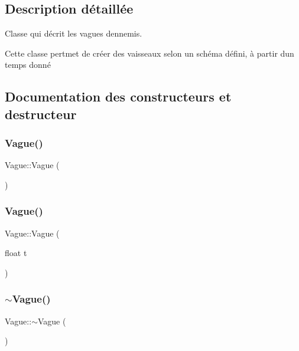 \subsection{Description détaillée}
Classe qui décrit les vagues d\textquotesingle{}ennemis. 

Cette classe pertmet de créer des vaisseaux selon un schéma défini, à partir d\textquotesingle{}un temps donné 

\subsection{Documentation des constructeurs et destructeur}
\mbox{\label{class_vague_ab1e4786aa02ad641431b56658dbbaac3}} 
\subsubsection{\texorpdfstring{Vague()}{Vague()}\hspace{0.1cm}{\footnotesize\ttfamily [1/2]}}
{\footnotesize\ttfamily Vague\+::\+Vague (\begin{DoxyParamCaption}{ }\end{DoxyParamCaption})}

\mbox{\label{class_vague_a5a77009c7b36f68c5c5090c72294faa4}} 
\subsubsection{\texorpdfstring{Vague()}{Vague()}\hspace{0.1cm}{\footnotesize\ttfamily [2/2]}}
{\footnotesize\ttfamily Vague\+::\+Vague (\begin{DoxyParamCaption}\item[{float}]{t }\end{DoxyParamCaption})\hspace{0.3cm}{\ttfamily [explicit]}}

\mbox{\label{class_vague_a72eb74bd6b6cc6de266fa4b8f77e56d4}} 
\subsubsection{\texorpdfstring{$\sim$\+Vague()}{~Vague()}}
{\footnotesize\ttfamily Vague\+::$\sim$\+Vague (\begin{DoxyParamCaption}{ }\end{DoxyParamCaption})}



